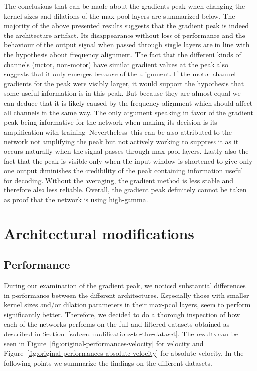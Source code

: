 The conclusions that can be made about the gradients peak when changing the kernel sizes and dilations of the max-pool layers are summarized below.
The majority of the above presented results suggests that the gradient peak is indeed the architecture artifact.
Its disappearance without loss of performance and the behaviour of the output signal when passed through single layers are in line with the hypothesis about frequency alignment.
The fact that the different kinds of channels (motor, non-motor) have similar gradient values at the peak also suggests that it only emerges because of the alignment.
If the motor channel gradients for the peak were visibly larger, it would support the hypothesis that some useful information is in this peak.
But because they are almost equal we can deduce that it is likely caused by the frequency alignment which should affect all channels in the same way.
The only argument speaking in favor of the gradient peak being informative for the network when making its decision is its amplification with training.
Nevertheless, this can be also attributed to the network not amplifying the peak but not actively working to suppress it as it occurs naturally when the signal passes through max-pool layers.
Lastly also the fact that the peak is visible only when the input window is shortened to give only one output diminishes the credibility of the peak containing information useful for decoding.
Without the averaging, the gradient method is less stable and therefore also less reliable. \todo{\cite{}}
Overall, the gradient peak definitely cannot be taken as proof that the network is using high-gamma.

\section{Architectural modifications}\label{sec:architectural-modifications}
\subsection{Performance}\label{subsec:performance}
During our examination of the gradient peak, we noticed substantial differences in performance between the different architectures.
Especially those with smaller kernel sizes and/or dilation parameters in their max-pool layers, seem to perform significantly better.
Therefore, we decided to do a thorough inspection of how each of the networks performs on the full and filtered datasets obtained as described in Section~\ref{subsec:modifications-to-the-dataset}.
The results can be seen in Figure~\ref{fig:original-performances-velocity} for velocity and Figure~\ref{fig:original-performances-absolute-velocity} for absolute velocity.
In the following points we summarize the findings on the different datasets.

